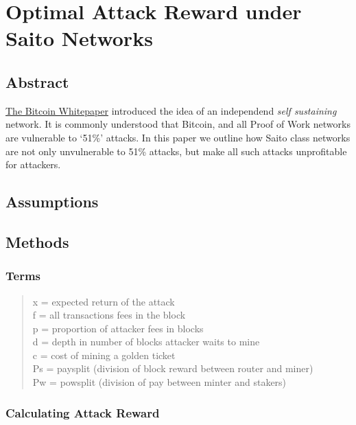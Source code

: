 \documentclass[
]{article}
\date{}
\begin{document}
\hypertarget{optimal-attack-reward-under-saito-networks}{%
\section{Optimal Attack Reward under Saito
Networks}\label{optimal-attack-reward-under-saito-networks}}

\hypertarget{abstract}{%
\subsection{Abstract}\label{abstract}}

\href{https://bitcoin.org/bitcoin.pdf}{The Bitcoin Whitepaper}
introduced the idea of an independend \emph{self sustaining} network. It
is commonly understood that Bitcoin, and all Proof of Work networks are
vulnerable to `51\%' attacks. In this paper we outline how Saito class
networks are not only unvulnerable to 51\% attacks, but make all such
attacks unprofitable for attackers.

\hypertarget{assumptions}{%
\subsection{Assumptions}\label{assumptions}}

\hypertarget{methods}{%
\subsection{Methods}\label{methods}}

\hypertarget{terms}{%
\subsubsection{Terms}\label{terms}}

\begin{quote}
x = expected return of the attack\\
f = all transactions fees in the block\\
p = proportion of attacker fees in blocks\\
d = depth in number of blocks attacker waits to mine\\
c = cost of mining a golden ticket\\
Ps = paysplit (division of block reward between router and miner)\\
Pw = powsplit (division of pay between minter and stakers)
\end{quote}

\hypertarget{calculating-attack-reward}{%
\subsubsection{Calculating Attack
Reward}\label{calculating-attack-reward}}
\end{document}
